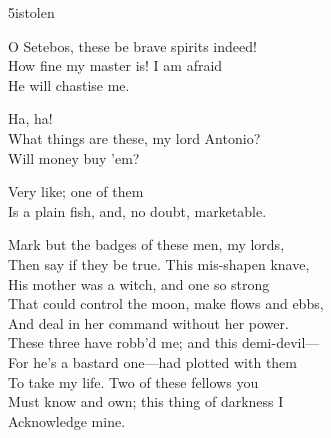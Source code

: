 \begin{bwbigpic}
	[\picwidth]
	{5istolen}
	{}
\end{bwbigpic}





\begin{verse_speech}[Caliban] 
O Setebos, these be brave spirits indeed!\\
How fine my master is! I am afraid\\
He will chastise me.
\end{verse_speech}

\begin{verse_speech}[Sebastian] 
Ha, ha!\\
What things are these, my lord Antonio?\\
Will money buy 'em?
\end{verse_speech}

\begin{verse_speech}[Antonio] 
Very like; one of them\\
Is a plain fish, and, no doubt, marketable.
\end{verse_speech}

\begin{verse_speech}[Prospero] 
Mark but the badges of these men, my lords,\\
Then say if they be true. This mis-shapen knave,\\
His mother was a witch, and one so strong\\
That could control the moon, make flows and ebbs,\\
And deal in her command without her power.\\
These three have robb'd me; and this demi-devil—\\
For he's a bastard one—had plotted with them\\
To take my life. Two of these fellows you\\
Must know and own; this thing of darkness I\\
Acknowledge mine.
\end{verse_speech}


